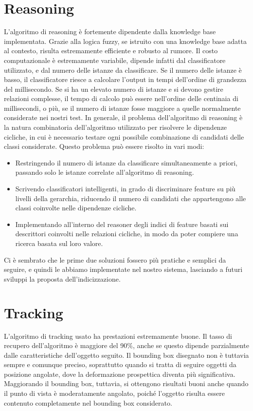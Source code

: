\section{Reasoning}
L'algoritmo di reasoning è fortemente dipendente dalla knowledge base implementata. Grazie alla logica fuzzy, se istruito con una knowledge base adatta al contesto, risulta estremamente efficiente e robusto al rumore. Il costo computazionale è estremamente variabile, dipende infatti dal classificatore utilizzato, e dal numero delle istanze da classificare. Se il numero delle istanze è basso, il classificatore riesce a calcolare l'output in tempi dell'ordine di grandezza del millisecondo. %
Se si ha un elevato numero di istanze e si devono gestire relazioni complesse, il tempo di calcolo può essere nell'ordine delle centinaia di millisecondi, o più, se il numero di istanze fosse maggiore a quelle normalmente considerate nei nostri test.
In generale, il problema dell'algoritmo di reasoning è la natura combinatoria dell'algoritmo utilizzato per risolvere le dipendenze cicliche, in cui è necessario testare ogni possibile combinazione di candidati delle classi considerate. Questo problema può essere risolto in vari modi: 
\begin{itemize}
 \item Restringendo il numero di istanze da classificare simultaneamente a priori, passando solo le istanze correlate all'algoritmo di reasoning.
 \item Scrivendo classificatori intelligenti, in grado di discriminare feature su più livelli della gerarchia, riducendo il numero di candidati che appartengono alle classi coinvolte nelle dipendenze cicliche.
 \item Implementando all'interno del reasoner degli indici di feature basati sui descrittori coinvolti nelle relazioni cicliche, in modo da poter compiere una ricerca basata sul loro valore.
\end{itemize}
Ci è sembrato che le prime due soluzioni fossero più pratiche e semplici da seguire, e quindi le abbiamo implementate nel nostro sistema, lasciando a futuri sviluppi la proposta dell'indicizzazione.

\section{Tracking}
L'algoritmo di tracking usato ha prestazioni estremamente buone. Il tasso di recupero dell'algoritmo è maggiore del 90\%, anche se questo dipende parzialmente dalle caratteristiche dell'oggetto seguito. Il bounding box disegnato non è tuttavia sempre e comunque preciso, soprattutto quando si tratta di seguire oggetti da posizione angolate, dove la deformazione prospettica diventa più significativa. Maggiorando il bounding box, tuttavia, si ottengono risultati buoni anche quando il punto di vista è moderatamente angolato, poiché l'oggetto risulta essere contenuto completamente nel bounding box considerato.

